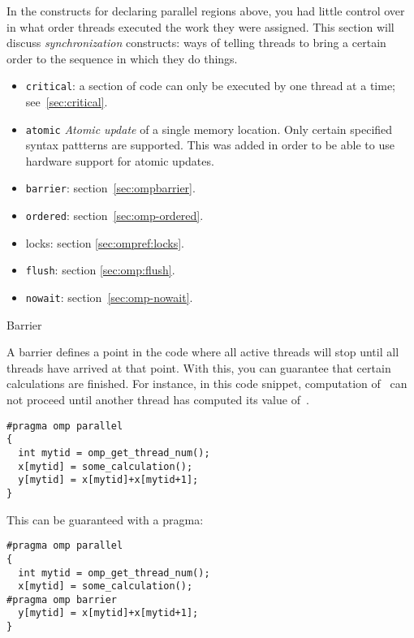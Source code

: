 

In the constructs for declaring parallel regions above, you had little control over 
in what order threads executed the work they were assigned.
This section will discuss \emph{synchronization} constructs: ways of telling
threads to bring a certain order to the sequence in which they do things.

\begin{itemize}
\item \texttt{critical}: a section of code can only be executed by one
  thread at a time; see~\ref{sec:critical}.
\item \texttt{atomic} \emph{Atomic update}
  of a single memory location. Only certain
  specified syntax pattterns are supported. This was added in order to
  be able to use hardware support for atomic updates.
\item \texttt{barrier}: section~\ref{sec:ompbarrier}.
\item \texttt{ordered}: section~\ref{sec:omp-ordered}.
\item locks: section \ref{sec:ompref:locks}.
\item \texttt{flush}: section \ref{sec:omp:flush}.
\item \texttt{nowait}: section~\ref{sec:omp-nowait}.
\end{itemize}

 {Barrier}
\label{sec:ompbarrier}

A barrier defines a point in the code where all active threads will stop
until all threads have arrived at that point. With this, you can guarantee that
certain calculations are finished. For instance, in this code snippet, computation 
of~ can not proceed until another thread has computed its value of~.
\begin{lstlisting}
#pragma omp parallel 
{
  int mytid = omp_get_thread_num();
  x[mytid] = some_calculation();
  y[mytid] = x[mytid]+x[mytid+1];
}
\end{lstlisting}
This can be guaranteed with a  pragma:
\begin{lstlisting}
#pragma omp parallel 
{
  int mytid = omp_get_thread_num();
  x[mytid] = some_calculation();
#pragma omp barrier
  y[mytid] = x[mytid]+x[mytid+1];
}
\end{lstlisting}

